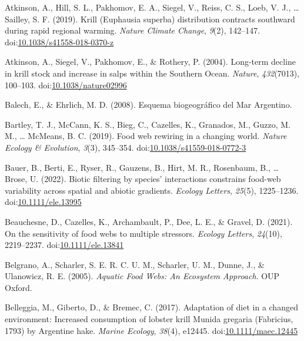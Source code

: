 \documentclass[
]{article}
\newlength{\cslhangindent}
\newenvironment{CSLReferences}[2] %
 {\begin{list}{}{%
  \setlength{\itemindent}{0pt}
  \setlength{\leftmargin}{0pt}
  \setlength{\parsep}{0pt}
  \ifodd #1
   \setlength{\leftmargin}{\cslhangindent}
   \setlength{\itemindent}{-1\cslhangindent}
  \fi
  \setlength{\itemsep}{#2\baselineskip}}}
 {\end{list}}
\begin{document}
\begin{CSLReferences}{1}{0}
Atkinson, A., Hill, S. L., Pakhomov, E. A., Siegel, V., Reiss, C. S.,
Loeb, V. J., \ldots{} Sailley, S. F. (2019). Krill ({Euphausia} superba)
distribution contracts southward during rapid regional warming.
\emph{Nature Climate Change}, \emph{9}(2), 142--147.
doi:\href{https://doi.org/10.1038/s41558-018-0370-z}{10.1038/s41558-018-0370-z}

Atkinson, A., Siegel, V., Pakhomov, E., \& Rothery, P. (2004). Long-term
decline in krill stock and increase in salps within the {Southern
Ocean}. \emph{Nature}, \emph{432}(7013), 100--103.
doi:\href{https://doi.org/10.1038/nature02996}{10.1038/nature02996}

Balech, E., \& Ehrlich, M. D. (2008). {Esquema biogeográfico del Mar
Argentino}.

Bartley, T. J., McCann, K. S., Bieg, C., Cazelles, K., Granados, M.,
Guzzo, M. M., \ldots{} McMeans, B. C. (2019). Food web rewiring in a
changing world. \emph{Nature Ecology \& Evolution}, \emph{3}(3),
345--354.
doi:\href{https://doi.org/10.1038/s41559-018-0772-3}{10.1038/s41559-018-0772-3}

Bauer, B., Berti, E., Ryser, R., Gauzens, B., Hirt, M. R., Rosenbaum,
B., \ldots{} Brose, U. (2022). Biotic filtering by species' interactions
constrains food-web variability across spatial and abiotic gradients.
\emph{Ecology Letters}, \emph{25}(5), 1225--1236.
doi:\href{https://doi.org/10.1111/ele.13995}{10.1111/ele.13995}

Beauchesne, D., Cazelles, K., Archambault, P., Dee, L. E., \& Gravel, D.
(2021). On the sensitivity of food webs to multiple stressors.
\emph{Ecology Letters}, \emph{24}(10), 2219--2237.
doi:\href{https://doi.org/10.1111/ele.13841}{10.1111/ele.13841}

Belgrano, A., Scharler, S. E. R. C. U. M., Scharler, U. M., Dunne, J.,
\& Ulanowicz, R. E. (2005). \emph{Aquatic {Food Webs}: {An Ecosystem
Approach}}. {OUP Oxford}.

Belleggia, M., Giberto, D., \& Bremec, C. (2017). Adaptation of diet in
a changed environment: {Increased} consumption of lobster krill {Munida}
gregaria ({Fabricius}, 1793) by {Argentine} hake. \emph{Marine Ecology},
\emph{38}(4), e12445.
doi:\href{https://doi.org/10.1111/maec.12445}{10.1111/maec.12445}


\end{CSLReferences}
\end{document}

